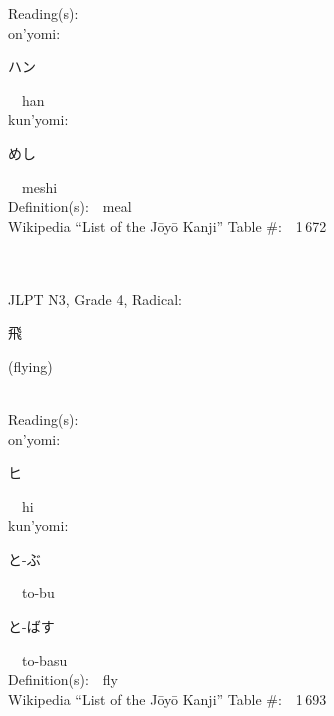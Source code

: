 \begin{multicols}{2}
Reading(s):\ \ \\
{\hspace*{1em}}on'yomi:\ \ \\
{\hspace*{2em}}{\begin{CJK}{UTF8}{min} ハン \end{CJK}}\ \ han\ \ \\
{\hspace*{1em}}kun'yomi:\ \ \\
{\hspace*{2em}}{\begin{CJK}{UTF8}{min} めし \end{CJK}}\ \ meshi\ \ \\
Definition(s):\ \ meal \\
Wikipedia ``List of the J\=oy\=o Kanji'' Table \#:\ \ 1\,672 \\
\ \ \\
{\fontsize{34pt}{40pt}  }\ \ \\  %
{JLPT N3, Grade 4, Radical:\ \ {\begin{CJK}{UTF8}{min} 飛 \end{CJK}} (flying) } \\
Reading(s):\ \ \\
{\hspace*{1em}}on'yomi:\ \ \\
{\hspace*{2em}}{\begin{CJK}{UTF8}{min} ヒ \end{CJK}}\ \ hi\ \ \\
{\hspace*{1em}}kun'yomi:\ \ \\
{\hspace*{2em}}{\begin{CJK}{UTF8}{min} と-ぶ \end{CJK}}\ \ to-bu\ \ \\
{\hspace*{2em}}{\begin{CJK}{UTF8}{min} と-ばす \end{CJK}}\ \ to-basu\ \ \\
Definition(s):\ \ fly \\
Wikipedia ``List of the J\=oy\=o Kanji'' Table \#:\ \ 1\,693 \\
\ \ \\

\end{multicols}
